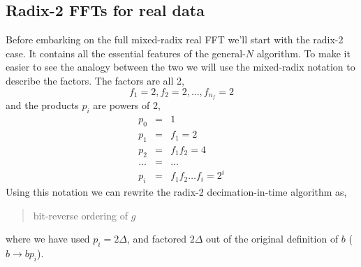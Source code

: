 \documentclass[fleqn,12pt]{article}
\newenvironment{algorithm}{\begin{quote} %
\begin{algorithmic}\samepage}{\end{algorithmic} %
\end{quote}}
\begin{document}
\subsection{Radix-2 FFTs for real data}
%
Before embarking on the full mixed-radix real FFT we'll start with the
radix-2 case. It contains all the essential features of the
general-$N$ algorithm. To make it easier to see the analogy between
the two we will use the mixed-radix notation to describe the
factors. The factors are all 2,
%
\begin{equation}
f_1 = 2, f_2 = 2, \dots, f_{n_f} = 2
\end{equation}
%
and the products $p_i$ are powers of 2,
%
\begin{eqnarray}
p_0 & = & 1 \\
p_1 & = & f_1 = 2 \\
p_2 & = & f_1 f_2 = 4 \\
\dots &=& \dots \\
p_i & = & f_1 f_2 \dots f_i = 2^i 
\end{eqnarray}
%
Using this notation we can rewrite the radix-2 decimation-in-time
algorithm as,
%
\begin{algorithm}
\STATE bit-reverse ordering of $g$
     \ENDFOR
  \ENDFOR
\ENDFOR
\end{algorithm}
%
where we have used $p_i = 2 \Delta$, and factored $2 \Delta$ out of
the original definition of $b$ ($b \to b p_i$).
\end{document}
